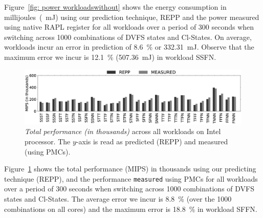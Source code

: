 Figure~\ref{fig: power workloadswithout} shows the energy consumption in
millijoules~(\SI{}{\milli\joule}) using our prediction technique, REPP and the power
measured using native RAPL register for all workloads over a period of 300 seconds when
switching across 1000 combinations of DVFS states and Cl-States. On average, workloads incur
an error in prediction of \SI{8.6}{\percent} or \SI{332.31}{\milli\joule}. Observe that
the maximum error we incur is \SI{12.1}{\percent} (\SI{507.36}{\milli\joule}) in workload
SSFN. 


\begin{figure}[t]
    \centering
    \includegraphics[width=\textwidth]{Chapter3/Figs/technical/perf-paae.eps}
    \caption[Performance prediction with multiple workloads without constraints.]{ \textit{Total performance (in thousands)} across all workloads on Intel processor. The $y$-axis is read as predicted (REPP) and measured (using PMCs).}
    \label{fig: perf workloadswithout}
\end{figure}

Figure~\ref{fig: perf workloadswithout} shows the total performance (MIPS) in thousands
using our predicting technique (REPP), and the performance \texttt{measured} using PMCs
for all workloads over a period of 300 seconds when switching across 1000 combinations of
DVFS states and Cl-States. The average error we incur is \SI{8.8}{\percent} (over the 1000
combinations on all cores) and the maximum error is \SI{18.8}{\percent} in workload SFFN. 

\begin{table}[tb]
\centering
    \caption[Prediction error without constraints while disregarding certain benchmark categories]{ Error is shown in terms of PAAE.}
\label{tab: ignoringbenchmark}
\end{table}

